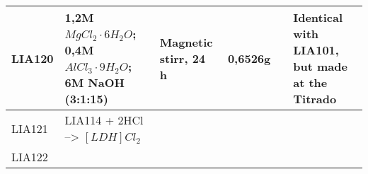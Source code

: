 \documentclass{article}
\begin{document}
\begin{landscape}
\begin{longtable}{| p{1.5cm} | p{5cm} | p{5cm} | p{1.5cm} | p{1.5cm}| p{2cm} |}
\hline
LIA120  &	1,2M $MgCl_2\cdot6H_2O$; 0,4M $AlCl_3\cdot9H_2O$; 6M NaOH (3:1:15) & Magnetic stirr, 24 h & 0,6526g & & Identical with LIA101, but made at the Titrado \\
\hline
LIA121 & LIA114 + 2HCl --> $[LDH]Cl_2$ & & & & \\
\hline
LIA122 &&&&& \\
\end{longtable}
\end{landscape}
\end{document}

